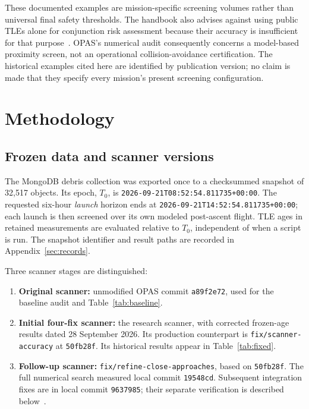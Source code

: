 \documentclass[11pt,a4paper]{article}
\begin{document}
These documented examples are mission-specific screening volumes rather
than universal final safety thresholds. The handbook also advises against
using public TLEs alone for conjunction risk assessment because their
accuracy is insufficient for that purpose~\cite{nasa_handbook}. OPAS's
numerical audit consequently concerns a model-based proximity screen,
not an operational collision-avoidance certification. The historical
examples cited here are identified by publication version; no claim is
made that they specify every mission's present screening configuration.

\section{Methodology}
\label{sec:methodology}

\subsection{Frozen data and scanner versions}

The MongoDB debris collection was exported once to a checksummed snapshot
of 32,517 objects. Its epoch, $T_0$, is
\texttt{2026-09-21T08:52:54.811735+00:00}. The requested six-hour
\emph{launch} horizon ends at
\texttt{2026-09-21T14:52:54.811735+00:00}; each launch is then screened
over its own modeled post-ascent flight. TLE ages in retained measurements
are evaluated relative to $T_0$, independent of when a script is run.
The snapshot identifier and result paths are recorded in
Appendix~\ref{sec:records}.

Three scanner stages are distinguished:
\begin{enumerate}
  \item \textbf{Original scanner:} unmodified OPAS commit
  \texttt{a89f2e72}, used for the baseline audit and Table~\ref{tab:baseline}.
  \item \textbf{Initial four-fix scanner:}
  the research scanner, with corrected frozen-age results
  dated 28 September 2026. Its production counterpart is
  \texttt{fix/scanner-accuracy} at \texttt{50fb28f}. Its historical results
  appear in Table~\ref{tab:fixed}.
  \item \textbf{Follow-up scanner:}
  \texttt{fix/refine-close-approaches}, based on \texttt{50fb28f}.
  The full numerical search measured local commit \texttt{19548cd}.
  Subsequent integration fixes are in local commit \texttt{9637985};
  their separate verification is described below~\cite{opas_validation}.
\end{enumerate}
\end{document}
